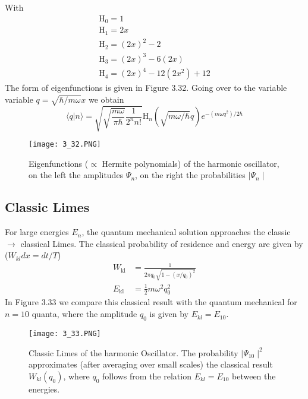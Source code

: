 With
\begin{equation}
\begin{array}{l}{\mathrm{H}_{0}=1} \\ {\mathrm{H}_{1}=2 x} \\ {\mathrm{H}_{2}=(2 x)^{2}-2} \\ {\mathrm{H}_{3}=(2 x)^{3}-6(2 x)} \\ {\mathrm{H}_{4}=(2 x)^{4}-12\left(2 x^{2}\right)+12}\end{array}
\end{equation}
The form of eigenfunctions is given in Figure 3.32. Going over to the variable variable $q = \sqrt{\hbar/ mω} x$ we ​​obtain
\begin{equation}
    \langle q | n\rangle=\sqrt{\sqrt{\frac{m \omega}{\pi \hbar}} \frac{1}{2^{n} n !}} \mathrm{H}_{n}(\sqrt{m \omega / \hbar} q) e^{-\left(m \omega q^{2}\right) / 2 \hbar}
    \end{equation}

\begin{figure}[ht]
        \centering
        \texttt{[image: 3\_32.PNG]}
        \caption{Eigenfunctions ($\propto$ Hermite polynomials) of the harmonic oscillator, on the left the amplitudes $\Psi_n$, on the right the probabilities $\mid \Psi_n\mid$}
\end{figure}
\subsection{Classic Limes}
For large energies $E_n$, the quantum mechanical solution approaches the classic $\to$ classical Limes. The classical probability of residence and energy are given by ($W_{kl}dx = dt / T$)
\begin{equation}
\begin{aligned} W_{\mathrm{kl}} &=\frac{1}{2 \pi q_{0} \sqrt{1-\left(x / q_{0}\right)^{2}}} \\ E_{\mathrm{kl}} &=\frac{1}{2} m \omega^{2} q_{0}^{2} \end{aligned}
\end{equation}
In Figure 3.33 we compare this classical result with the quantum mechanical for $n=10$ quanta, where the amplitude $q_0$ is given by $E_{kl} = E_{10}$.
\begin{figure}[ht]
    \begin{minipage}{0.5\textwidth}
        \centering
        \texttt{[image: 3\_33.PNG]}
    \end{minipage}
    \begin{minipage}{0.5\textwidth}
        \caption{Classic Limes of the harmonic Oscillator. The probability $\mid\Psi_{10}\mid^2$ approximates (after averaging over small scales) the classical result $W_{kl}(q_0)$, where $q_0$ follows from the relation $E_{kl} = E_{10}$ between the energies.}
    \end{minipage}
\end{figure}

